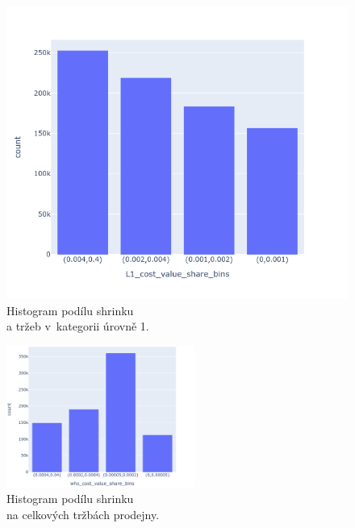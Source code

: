 \begin{figure}[h!]
\begin{minipage}[b]{.55\textwidth}
        \includegraphics[width=\textwidth]{obrazky/grafy/histogram/newplot(3).png}
        \vspace*{-3em}
        \caption{Histogram podílu shrinku \\a tržeb v~kategorii úrovně 1.}
        \label{obr:nb:hist4}
    \end{minipage}     
       \vspace*{-1em}
\end{figure}

\begin{figure}[h!]
        \centering
        \captionsetup{justification=centering}
        \includegraphics[width=0.55\textwidth]{obrazky/grafy/histogram/newplot(4).png}
        \caption{Histogram podílu shrinku \\na celkových tržbách prodejny.}
        \label{obr:nb:hist5}
        \vspace*{-1em}
\end{figure}

